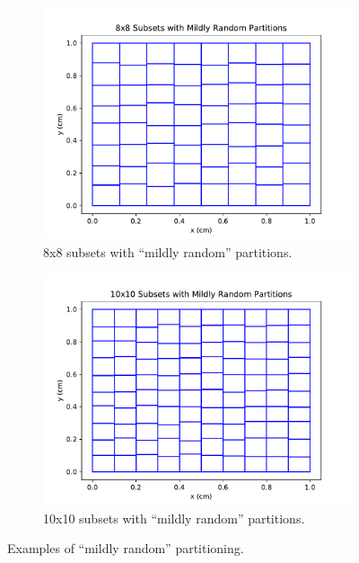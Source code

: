 \begin{figure}[H]
\begin{subfigure}[b]{0.45\textwidth}
  \includegraphics[width=\textwidth]{../cut_line_files/8_mild_random.pdf}
  \caption{8x8 subsets with ``mildly random'' partitions.}
  \label{8mildrandom}
\end{subfigure}
\begin{subfigure}[b]{0.45\textwidth}
  \includegraphics[width=\textwidth]{../cut_line_files/10_mild_random.pdf}
  \caption{10x10 subsets with ``mildly random'' partitions.}
  \label{10mildrandom}
\end{subfigure}
\caption{Examples of ``mildly random'' partitioning.}
\label{mild_random_partitions}
\end{figure}

